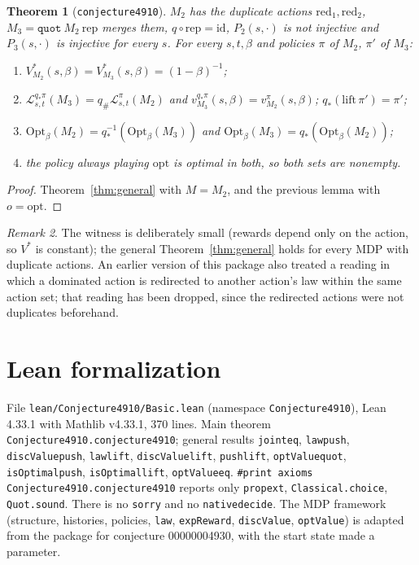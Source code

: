 \documentclass[11pt]{article}
\newtheorem{theorem}{Theorem}
\theoremstyle{definition}
\theoremstyle{remark}
\newtheorem{remark}[theorem]{Remark}
\renewcommand{\_}{\oldus\allowbreak}
\begin{document}
\begin{theorem}[\texttt{conjecture4910}]
$M_2$ has the duplicate actions $\mathrm{red}_1,\mathrm{red}_2$, $M_3=\texttt{quot}\ M_2\
\mathrm{rep}$ merges them, $q\circ\mathrm{rep}=\mathrm{id}$, $P_2(s,\cdot)$ is not injective and
$P_3(s,\cdot)$ is injective for every $s$. For every $s,t,\beta$ and policies $\pi$ of $M_2$,
$\pi'$ of $M_3$:
\begin{enumerate}
\item $V^*_{M_2}(s,\beta)=V^*_{M_3}(s,\beta)=(1-\beta)^{-1}$;
\item $\mathcal L^{q_*\pi}_{s,t}(M_3)=q_\#\mathcal L^\pi_{s,t}(M_2)$ and
$v^{q_*\pi}_{M_3}(s,\beta)=v^\pi_{M_2}(s,\beta)$; $q_*(\mathrm{lift}\,\pi')=\pi'$;
\item $\mathrm{Opt}_\beta(M_2)=q_*^{-1}(\mathrm{Opt}_\beta(M_3))$ and
$\mathrm{Opt}_\beta(M_3)=q_*(\mathrm{Opt}_\beta(M_2))$;
\item the policy always playing $\mathrm{opt}$ is optimal in both, so both sets are nonempty.
\end{enumerate}
\end{theorem}
\begin{proof}
Theorem~\ref{thm:general} with $M=M_2$, and the previous lemma with $o=\mathrm{opt}$.
\end{proof}

\begin{remark}
The witness is deliberately small (rewards depend only on the action, so $V^*$ is constant); the
general Theorem~\ref{thm:general} holds for every MDP with duplicate actions. An earlier version of
this package also treated a reading in which a dominated action is redirected to another action's
law within the same action set; that reading has been dropped, since the redirected actions were
not duplicates beforehand.
\end{remark}

\section{Lean formalization}

File \texttt{lean/Conjecture4910/Basic.lean} (namespace \texttt{Conjecture4910}), Lean 4.33.1 with
Mathlib v4.33.1, 370 lines. Main theorem \texttt{Conjecture4910.conjecture4910}; general results
\texttt{joint\_eq}, \texttt{law\_push}, \texttt{discValue\_push}, \texttt{law\_lift},
\texttt{discValue\_lift}, \texttt{push\_lift}, \texttt{optValue\_quot}, \texttt{isOptimal\_push},
\texttt{isOptimal\_lift}, \texttt{optValue\_eq}. \texttt{\#print axioms
Conjecture4910.conjecture4910} reports only \texttt{propext}, \texttt{Classical.choice},
\texttt{Quot.sound}. There is no \texttt{sorry} and no \texttt{native\_decide}. The MDP framework
(structure, histories, policies, \texttt{law}, \texttt{expReward}, \texttt{discValue},
\texttt{optValue}) is adapted from the package for conjecture 00000004930, with the start state
made a parameter.
\end{document}
